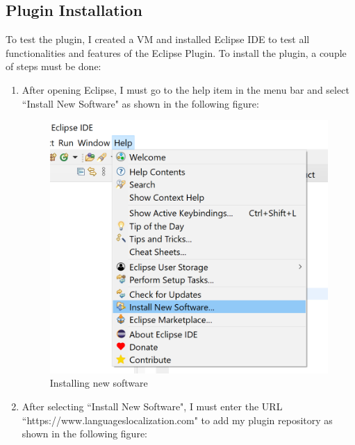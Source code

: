\subsection{Plugin Installation}
To test the plugin, I created a \ac{VM} and installed Eclipse IDE to test all functionalities and features of the Eclipse Plugin. To install the plugin, a couple of steps must be done:

\begin{enumerate}
    \item After opening Eclipse, I must go to the help item in the menu bar and select ``Install New Software" as shown in the following figure:

    \begin{figure}[H]
        \centering
        \includegraphics{ch3-images/installsoftware.png}
        \caption{Installing new software}
        \label{fig: Installing New Software}
    \end{figure}

    \item After selecting ``Install New Software", I must enter the \ac{URL} ``https://www.languageslocalization.com" to add my plugin repository as shown in the following figure:


\end{enumerate}
